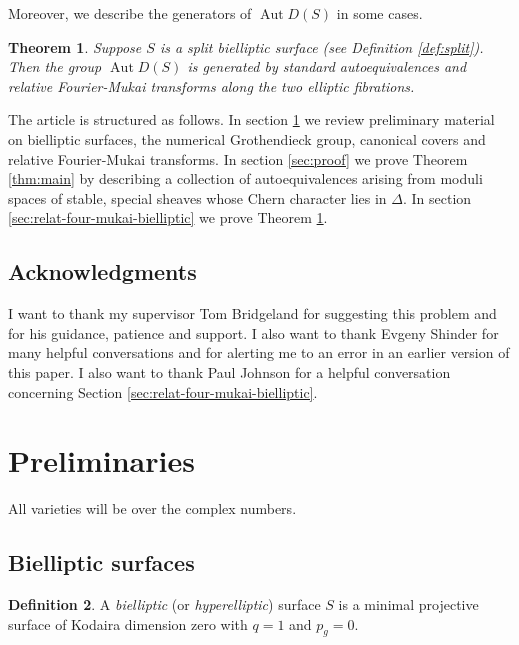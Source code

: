 \documentclass[a4paper, 12pt, twoside]{amsart}
\theoremstyle{plain}
\newtheorem{theorem}{Theorem}[section]
\theoremstyle{definition}
\newtheorem{definition}[theorem]{Definition}
\DeclareMathOperator{\Aut}{Aut}
\begin{document}
Moreover, we describe the generators of $\Aut D(S)$ in some cases.

\begin{theorem}\label{thm:generators}
  Suppose $S$ is a split bielliptic surface (see Definition
  \ref{def:split}). Then the group $\Aut D(S)$ is generated by
  standard autoequivalences and relative Fourier-Mukai transforms
  along the two elliptic fibrations.
\end{theorem}

The article is structured as follows. In section
\ref{sec:preliminaries} we review preliminary material on bielliptic
surfaces, the numerical Grothendieck group, canonical covers and
relative Fourier-Mukai transforms. In section \ref{sec:proof} we prove
Theorem \ref{thm:main} by describing a collection of autoequivalences
arising from moduli spaces of stable, special sheaves whose Chern
character lies in $\Delta$. In section
\ref{sec:relat-four-mukai-bielliptic} we prove Theorem
\ref{thm:generators}.

\subsection*{Acknowledgments}
\label{sec:aclnowledgements}

I want to thank my supervisor Tom Bridgeland for suggesting this
problem and for his guidance, patience and support. I also want to
thank Evgeny Shinder for many helpful conversations and for alerting
me to an error in an earlier version of this paper. I also want to
thank Paul Johnson for a helpful conversation concerning Section
\ref{sec:relat-four-mukai-bielliptic}.

\section{Preliminaries}
\label{sec:preliminaries}

All varieties will be over the complex numbers.

\subsection{Bielliptic surfaces}
\label{sec:bielliptic-surfaces}

\begin{definition}
  A \emph{bielliptic} (or \emph{hyperelliptic}) surface $S$ is a
  minimal projective surface of Kodaira dimension zero with $q=1$ and
  $p_g=0$.
\end{definition}
\end{document}
